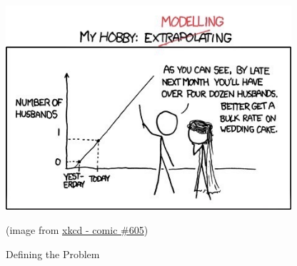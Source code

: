 \begin{topic}
\begin{center}
\begin{minipage}{300pt}
	\includegraphics*[width=300pt]{images/chap1-xkcd.jpg}

	\hfill {\footnotesize (image from \href{https://www.xkcd.com/605/}{xkcd - comic \#605})}
\end{minipage}
\end{center}




\end{topic}






%
%




\begin{module}{Defining the Problem}
	\label{mod:define}

	
	
\end{module}



